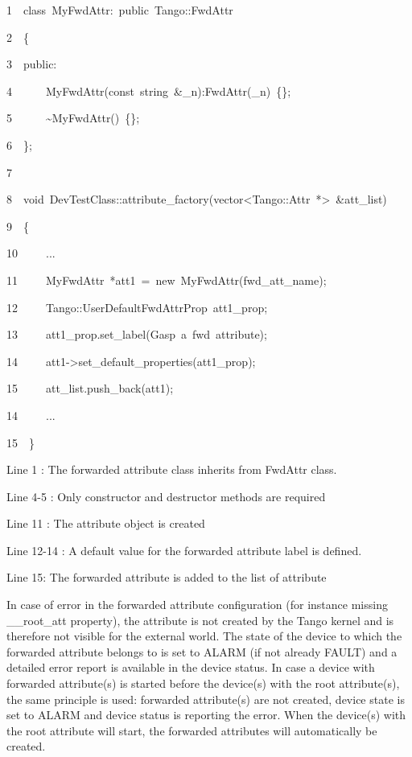 
\begin{lyxcode}
1~~class~MyFwdAttr:~public~Tango::FwdAttr

2~~\{~

3~~public:~~~~~

4~~~~~~MyFwdAttr(const~string~\&\_n):FwdAttr(\_n)~\{\};~	

5~~~~~~\textasciitilde{}MyFwdAttr()~\{\};~

6~~\};

7

8~~void~DevTestClass::attribute\_factory(vector<Tango::Attr~{*}>~\&att\_list)

9~~\{

10~~~~~...

11~~~~~MyFwdAttr~{*}att1~=~new~MyFwdAttr(\textquotedbl{}fwd\_att\_name\textquotedbl{});

12~~~~~Tango::UserDefaultFwdAttrProp~att1\_prop;~	

13~~~~~att1\_prop.set\_label(\textquotedbl{}Gasp~a~fwd~attribute\textquotedbl{});

14~~~~~att1->set\_default\_properties(att1\_prop);~	

15~~~~~att\_list.push\_back(att1);

14~~~~~...

15~~\}
\end{lyxcode}


Line 1 : The forwarded attribute class inherits from FwdAttr class.

Line 4-5 : Only constructor and destructor methods are required

Line 11 : The attribute object is created

Line 12-14 : A default value for the forwarded attribute label is
defined.

Line 15: The forwarded attribute is added to the list of attribute

In case of error in the forwarded attribute configuration (for instance
missing \_\_root\_att property), the attribute is not created by the
Tango kernel and is therefore not visible for the external world.
The state of the device to which the forwarded attribute belongs to
is set to ALARM (if not already FAULT) and a detailed error report
is available in the device status. In case a device with forwarded
attribute(s) is started before the device(s) with the root attribute(s),
the same principle is used: forwarded attribute(s) are not created,
device state is set to ALARM and device status is reporting the error.
When the device(s) with the root attribute will start, the forwarded
attributes will automatically be created. 


